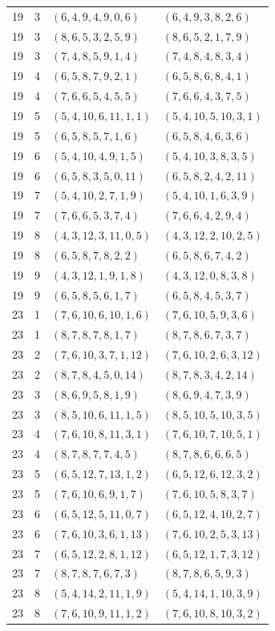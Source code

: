 \documentclass[11pt,a4paper]{article}
\theoremstyle{definition}
\numberwithin{equation}{section}
\begin{document}
\begin{longtable}{rrll}
19&3&$(6,4,9,4,9,0,6)$&$(6,4,9,3,8,2,6)$\\
19&3&$(8,6,5,3,2,5,9)$&$(8,6,5,2,1,7,9)$\\
19&3&$(7,4,8,5,9,1,4)$&$(7,4,8,4,8,3,4)$\\
19&4&$(6,5,8,7,9,2,1)$&$(6,5,8,6,8,4,1)$\\
19&4&$(7,6,6,5,4,5,5)$&$(7,6,6,4,3,7,5)$\\
19&5&$(5,4,10,6,11,1,1)$&$(5,4,10,5,10,3,1)$\\
19&5&$(6,5,8,5,7,1,6)$&$(6,5,8,4,6,3,6)$\\
19&6&$(5,4,10,4,9,1,5)$&$(5,4,10,3,8,3,5)$\\
19&6&$(6,5,8,3,5,0,11)$&$(6,5,8,2,4,2,11)$\\
19&7&$(5,4,10,2,7,1,9)$&$(5,4,10,1,6,3,9)$\\
19&7&$(7,6,6,5,3,7,4)$&$(7,6,6,4,2,9,4)$\\
19&8&$(4,3,12,3,11,0,5)$&$(4,3,12,2,10,2,5)$\\
19&8&$(6,5,8,7,8,2,2)$&$(6,5,8,6,7,4,2)$\\
19&9&$(4,3,12,1,9,1,8)$&$(4,3,12,0,8,3,8)$\\
19&9&$(6,5,8,5,6,1,7)$&$(6,5,8,4,5,3,7)$\\
23&1&$(7,6,10,6,10,1,6)$&$(7,6,10,5,9,3,6)$\\
23&1&$(8,7,8,7,8,1,7)$&$(8,7,8,6,7,3,7)$\\
23&2&$(7,6,10,3,7,1,12)$&$(7,6,10,2,6,3,12)$\\
23&2&$(8,7,8,4,5,0,14)$&$(8,7,8,3,4,2,14)$\\
23&3&$(8,6,9,5,8,1,9)$&$(8,6,9,4,7,3,9)$\\
23&3&$(8,5,10,6,11,1,5)$&$(8,5,10,5,10,3,5)$\\
23&4&$(7,6,10,8,11,3,1)$&$(7,6,10,7,10,5,1)$\\
23&4&$(8,7,8,7,7,4,5)$&$(8,7,8,6,6,6,5)$\\
23&5&$(6,5,12,7,13,1,2)$&$(6,5,12,6,12,3,2)$\\
23&5&$(7,6,10,6,9,1,7)$&$(7,6,10,5,8,3,7)$\\
23&6&$(6,5,12,5,11,0,7)$&$(6,5,12,4,10,2,7)$\\
23&6&$(7,6,10,3,6,1,13)$&$(7,6,10,2,5,3,13)$\\
23&7&$(6,5,12,2,8,1,12)$&$(6,5,12,1,7,3,12)$\\
23&7&$(8,7,8,7,6,7,3)$&$(8,7,8,6,5,9,3)$\\
23&8&$(5,4,14,2,11,1,9)$&$(5,4,14,1,10,3,9)$\\
23&8&$(7,6,10,9,11,1,2)$&$(7,6,10,8,10,3,2)$\\

\end{longtable}
\end{document}

